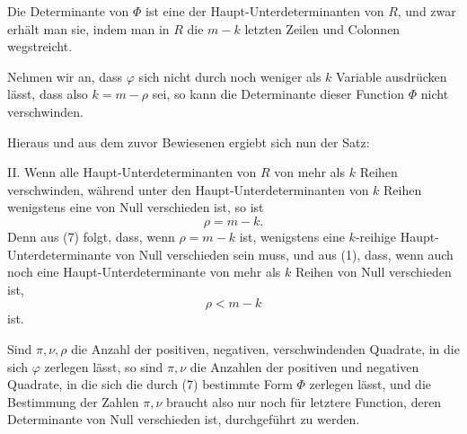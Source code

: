\documentclass[11pt]{article}
\begin{document}
Die Determinante von $\Phi$ ist eine der Haupt-Unterdeterminanten von $R$, und zwar erh\"alt man sie, indem man in $R$ die $m-k$ letzten Zeilen und Colonnen wegstreicht.

Nehmen wir an, dass $\varphi$ sich nicht durch noch weniger als $k$ Variable ausdr\"ucken l\"asst, dass also $k=m-\rho$ sei, so kann die Determinante dieser Function $\Phi$ nicht verschwinden.

Hieraus und aus dem zuvor Bewiesenen ergiebt sich nun der Satz:

II. Wenn alle Haupt-Unterdeterminanten von $R$ von mehr als $k$ Reihen verschwinden, w\"ahrend unter den Haupt-Unterdeterminanten von $k$ Reihen wenigstens eine von Null verschieden ist, so ist
\[
        \rho=m-k.
\]
Denn aus (7) folgt, dass, wenn $\rho=m-k$ ist, wenigstens eine $k$-reihige Haupt-Unterdeterminante von Null verschieden sein muss, und aus (1), dass, wenn auch noch eine Haupt-Unterdeterminante von mehr als $k$ Reihen von Null verschieden ist,
\[
        \rho<m-k
\]
ist.

Sind $\pi,\nu,\rho$ die Anzahl der positiven, negativen, verschwindenden Quadrate, in die sich $\varphi$ zerlegen l\"asst, so sind $\pi,\nu$ die Anzahlen der positiven und negativen Quadrate, in die sich die durch (7) bestimmte Form $\Phi$ zerlegen l\"asst, und die Bestimmung der Zahlen $\pi,\nu$ braucht also nur noch f\"ur letztere Function, deren Determinante von Null verschieden ist, durchgef\"uhrt zu werden.
\end{document}
